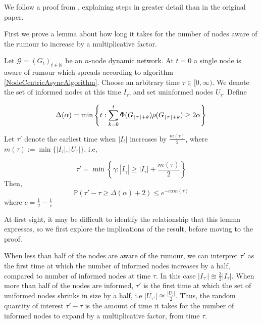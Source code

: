 We follow a proof from \cite{asyncPaper}, explaining steps in greater detail than in the original paper.

First we prove a lemma about how long it takes for the number of nodes aware of the rumour to increase by a multiplicative factor. 

\begin{lemma} \label{AsyncIncreaseLemma}
	Let $\mathcal{G}=(G_t)_{t \in \mathbb{N}}$ be an $n$-node dynamic network. At $t=0$ a single node is aware of rumour which spreads according to algorithm \ref{NodeCentricAsyncAlgorithm}. Choose an arbitrary time $\tau \in [0, \infty)$. We denote the set of informed nodes at this time $I_\tau$, and set uninformed nodes $U_\tau$.
	\noindent
	Define 
	
	$$
	\Delta(\alpha) = \min \left\{t: \sum_{k=0}^t \Phi(G_{\lceil\tau\rceil+k})\rho(G_{\lceil\tau\rceil+k}) \geq 2 \alpha \right\}
	$$

	\noindent
	Let $\tau'$ denote the earliest time when $|I_t|$ increases by $\frac{m(\tau)}{2}$, where $m(\tau) := \min\{|I_\tau|, |U_\tau|\}$, i.e,

	$$
		\tau' = \min\left\{\gamma : |I_{\gamma}| \geq |I_\tau| + \frac{m(\tau)}{2}\right\}
	$$
	\noindent
	Then, 
	$$
		\mathbb{P}(\tau' - \tau \geq \Delta(\alpha) + 2) \leq e^{-c\alpha m(\tau)}
	$$
	\noindent
	where $c = \frac{1}{2} - \frac{1}{e}$
\end{lemma}


At first sight, it may be difficult to identify the relationship that this lemma expresses, so we first explore the implications of the result, before moving to the proof.

When less than half of the nodes are aware of the rumour, we can interpret $\tau'$ as the first time at which the number of informed nodes increases by a half, compared to number of informed nodes at time $\tau$. In this case $|I_{\tau'}| \approxeq \frac{3}{2} |I_\tau|$. When more than half of the nodes are informed, $\tau'$ is the first time at which the set of uniformed nodes shrinks in size by a half, i.e $|U_{\tau'}| \approxeq \frac{|U_\tau|}{2}$. Thus, the random quantity of interest $\tau'-\tau$ is the amount of time it takes for the number of informed nodes to expand by a multiplicative factor, from time $\tau$. 

